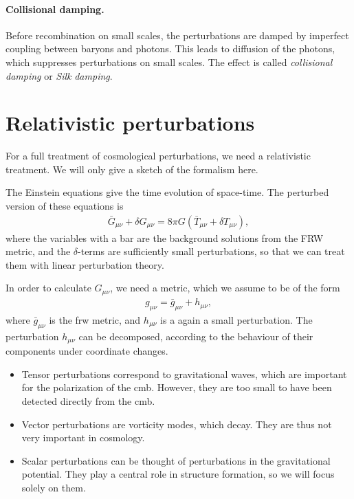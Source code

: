 \paragraph*{Collisional damping.}
Before recombination on small scales, the perturbations are damped by imperfect coupling between baryons and photons. This leads to diffusion of the photons, which suppresses perturbations on small scales. The effect is called \emph{collisional damping} or \emph{Silk} \emph{damping}.



\section{Relativistic perturbations}
For a full treatment of cosmological perturbations, we need a relativistic treatment. We will only give a sketch of the formalism here.

The Einstein equations give the time evolution of space-time. The perturbed version of these equations is
\begin{align*}
	\bar{G}_{\mu\nu} + \delta G_{\mu\nu} = 8 \pi G (\bar{T}_{\mu\nu} + \delta T_{\mu\nu}),
\end{align*}
where the variables with a bar are the background solutions from the FRW metric, and the $\delta$-terms are sufficiently small perturbations, so that we can treat them with linear perturbation theory.

In order to calculate $G_{\mu\nu}$, we need a metric, which we assume to be of the form
\begin{align*}
	g_{\mu \nu} = \bar{g}_{\mu\nu} + h_{\mu\nu},
\end{align*}
where $\bar{g}_{\mu\nu}$ is the \ac{frw} metric, and $h_{\mu\nu}$ is a again a small perturbation.
The perturbation $h_{\mu\nu}$ can be decomposed, according to the behaviour of their components under coordinate changes.
\begin{itemize}
	\item Tensor perturbations correspond to gravitational waves, which are important for the polarization of the \ac{cmb}. However, they are too small to have been detected directly from the \ac{cmb}.
	\item Vector perturbations are vorticity modes, which decay. They are thus not very important in cosmology.
	\item Scalar perturbations can be thought of perturbations in the gravitational potential. They play a central role in structure formation, so we will focus solely on them.
\end{itemize}

